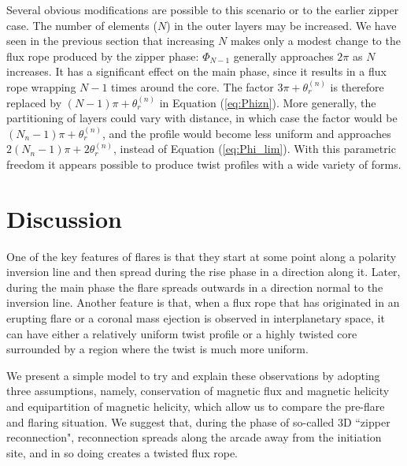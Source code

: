 \documentclass[10pt,namedreferneces]{SolarPhysics}
\begin{document}
\begin{article}
Several obvious modifications are possible to this scenario or to the earlier zipper case.  The number of elements ($N$) in the outer layers may be increased.  We have seen in the previous section that increasing $N$ makes only a modest change to the flux rope produced by the zipper phase: $\Phi_{N-1}$ generally approaches $2\pi$ as $N$ increases.  It has a significant effect on the main phase, since it results in a flux rope wrapping $N-1$ times around the core.  The factor $3\pi+\theta_r^{(n)}$ is therefore replaced by $(N-1)\pi+\theta_r^{(n)}$ in Equation (\ref{eq:Phizn}).  More generally, the partitioning of layers could vary with distance, in which case the factor would be $(N_n-1)\pi+\theta_r^{(n)}$, and the profile would become less uniform and approaches $2(N_n-1)\pi+2\theta_r^{(n)}$, instead of Equation  (\ref{eq:Phi_lim}).  With this parametric freedom it appears possible to produce twist profiles with a wide variety of forms.  

\section{Discussion} 
\label{sect_6}

One of the key features of flares is that they start at some point along a polarity inversion line and then spread during the rise phase in a direction along it. Later, during the main phase the flare spreads outwards in a direction normal to the inversion line.  Another feature is that, when a flux rope that has originated in an erupting flare or a coronal mass ejection is observed in interplanetary space, it can have either a relatively uniform twist profile or a highly twisted core surrounded by a region where the twist is much more uniform.

We  present a simple model to try and explain these observations by adopting three assumptions, namely, conservation of magnetic flux and magnetic helicity and equipartition of magnetic helicity, which allow us to compare the pre-flare and flaring situation. We suggest that, during the phase of so-called 3D ``zipper reconnection",  reconnection spreads along the arcade away from the initiation site, and in so doing creates a twisted flux rope.  


\end{article}
\end{document}
